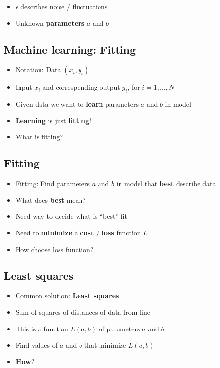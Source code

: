 \begin{itemize}
\item
  \(\epsilon\) describes noise / fluctuations
\item
  Unknown \textbf{parameters} \(a\) and \(b\)
\end{itemize}

\hypertarget{machine-learning-fitting}{%
\subsection{Machine learning: Fitting}\label{machine-learning-fitting}}

\begin{itemize}
\item
  Notation: Data \((x_i, y_i)\)
\item
  Input \(x_i\) and corresponding output \(y_i\), for \(i=1,\ldots, N\)
\item
  Given data we want to \textbf{learn} parameters \(a\) and \(b\) in
  model
\item
  \textbf{Learning} is just \textbf{fitting}!
\item
  What is fitting?
\end{itemize}

\hypertarget{fitting}{%
\subsection{Fitting}\label{fitting}}

\begin{itemize}
\item
  Fitting: Find parameters \(a\) and \(b\) in model that \textbf{best}
  describe data
\item
  What does \textbf{best} mean?
\item
  Need way to decide what is ``best'' fit
\item
  Need to \textbf{minimize} a \textbf{cost} / \textbf{loss} function
  \(L\)
\item
  How choose loss function?
\end{itemize}

\hypertarget{least-squares}{%
\subsection{Least squares}\label{least-squares}}

\begin{itemize}
\item
  Common solution: \textbf{Least squares}
\item
  Sum of squares of distances of data from line
\item
  This is a function \(L(a, b)\) of parameters \(a\) and \(b\)
\item
  Find values of \(a\) and \(b\) that minimize \(L(a, b)\)
\item
  \textbf{How}?
\end{itemize}

